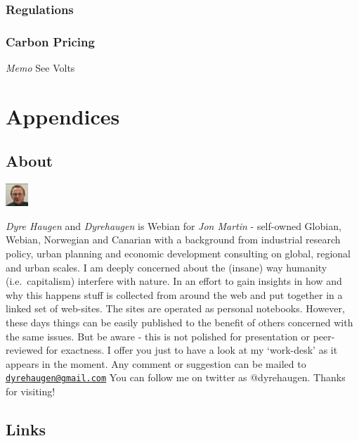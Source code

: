 \documentclass[
]{book}
\begin{document}
\hypertarget{regulations}{%
\section{Regulations}\label{regulations}}

\hypertarget{carbon-pricing}{%
\section{Carbon Pricing}\label{carbon-pricing}}

\emph{Memo} See Volts

\hypertarget{part-appendices}{%
\part{Appendices}\label{part-appendices}}

\hypertarget{appendix-appendices}{%
\appendix}


\hypertarget{about}{%
\chapter{About}\label{about}}

\includegraphics{fig/me.jpg}

\emph{Dyre Haugen} and \emph{Dyrehaugen} is Webian for \emph{Jon Martin} -
self-owned Globian, Webian, Norwegian and Canarian with
a background from industrial research policy, urban planning and
economic development consulting on global, regional and urban scales.
I am deeply concerned about the (insane) way
humanity (i.e.~capitalism) interfere with nature.
In an effort to gain insights in how and why this happens
stuff is collected from around the web and put together
in a linked set of web-sites.
The sites are operated as personal notebooks.
However, these days things can be easily published to the
benefit of others concerned with the same issues.
But be aware - this is not polished for presentation or
peer-reviewed for exactness.
I offer you just to have a look at my `work-desk' as it appears in the moment.
Any comment or suggestion can be mailed to \href{mailto:dyrehaugen@gmail.com}{\nolinkurl{dyrehaugen@gmail.com}}
You can follow me on twitter as @dyrehaugen.
Thanks for visiting!

\hypertarget{links}{%
\chapter{Links}\label{links}}
\end{document}
